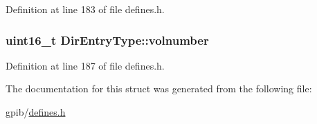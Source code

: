 Definition at line 183 of file defines.\-h.

\hypertarget{structDirEntryType_add9ab11f89586efb100471f6580e75c5}{
\subsubsection[{volnumber}]{\setlength{\rightskip}{0pt plus 5cm}uint16\-\_\-t Dir\-Entry\-Type\-::volnumber}}\label{structDirEntryType_add9ab11f89586efb100471f6580e75c5}


Definition at line 187 of file defines.\-h.



The documentation for this struct was generated from the following file\-:\begin{DoxyCompactItemize}
\item 
gpib/\hyperlink{defines_8h}{defines.\-h}\end{DoxyCompactItemize}
